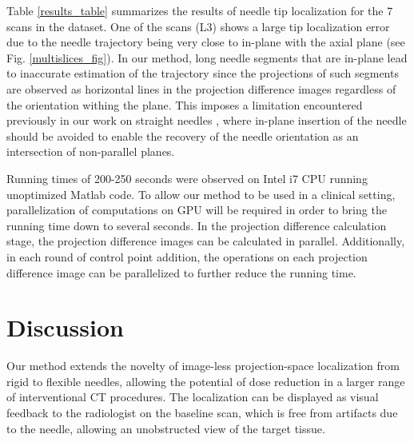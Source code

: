 Table \ref{results_table} summarizes the results of needle tip localization for the 7 scans in the dataset. One of the scans (L3) shows a large tip localization error due to the needle trajectory being very close to in-plane with the axial plane (see Fig. \ref{multislices_fig}). In our method, long needle segments that are in-plane lead to inaccurate estimation of the trajectory since the projections of such segments are observed as horizontal lines in the projection difference images regardless of the orientation withing the plane. This imposes a limitation encountered previously in our work on straight needles \cite{medan2017reduced}, where in-plane insertion of the needle should be avoided to enable the recovery of the needle orientation as an intersection of non-parallel planes.

Running times of 200-250 seconds were observed on Intel i7 CPU running unoptimized Matlab code. To allow our method to be used in a clinical setting, parallelization of computations on GPU will be required in order to bring the running time down to several seconds. In the projection difference calculation stage, the projection difference images can be calculated in parallel. Additionally, in each round of control point addition, the operations on each projection difference image can be parallelized to further reduce the running time.

\section{Discussion}
Our method extends the novelty of image-less projection-space localization from rigid to flexible needles, allowing the potential of dose reduction in a larger range of interventional CT procedures. The localization can be displayed as visual feedback to the radiologist on the baseline scan, which is free from artifacts due to the needle, allowing an unobstructed view of the target tissue.

